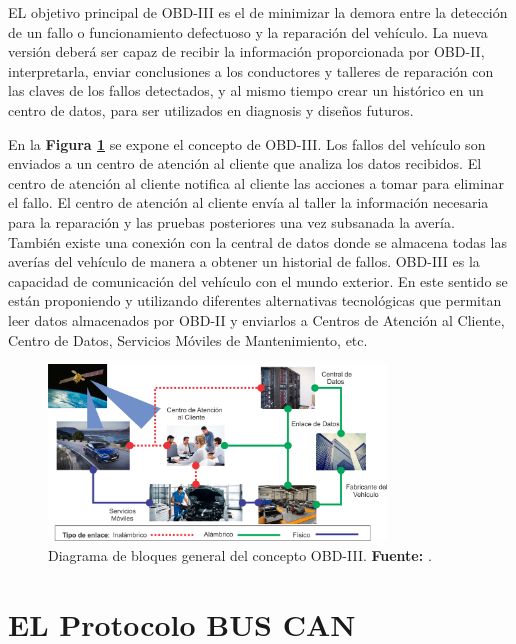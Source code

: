 EL objetivo principal de OBD-III es el de minimizar la demora entre la detección de un fallo o funcionamiento defectuoso y la reparación del vehículo. La nueva versión deberá ser capaz de recibir la información proporcionada por OBD-II, interpretarla, enviar conclusiones a los conductores y talleres de reparación con las claves de los fallos detectados, y al mismo tiempo crear  un histórico en un centro de datos, para ser utilizados en diagnosis y diseños futuros.


En la  \textbf{Figura \ref{DenB}} se expone el concepto de OBD-III. Los fallos del vehículo son enviados  a un centro de atención al cliente que analiza los datos recibidos. El centro de atención al cliente notifica al cliente las acciones a tomar para eliminar el fallo. El centro de atención al cliente envía al taller la información necesaria para la reparación  y las pruebas posteriores una vez subsanada la avería. También existe una conexión con la central de datos donde se almacena todas las averías del vehículo de manera a obtener un historial de fallos.
OBD-III es la capacidad de comunicación del vehículo con el mundo exterior. En este sentido se están proponiendo y utilizando diferentes alternativas tecnológicas que permitan leer datos almacenados por OBD-II y enviarlos a Centros de Atención al Cliente, Centro de Datos, Servicios Móviles de Mantenimiento, etc.

\begin{figure}[H]
	\centering
		\includegraphics[width=0.8\textwidth]{./Cap2imagen/J_concepto_OBDIII.png}
	\caption[Diagrama de bloques general del concepto OBD-III.]{Diagrama de bloques general del concepto OBD-III.\textbf{ Fuente:} \cite{DE}.}
	\label{DenB} %
\end{figure}


\section {EL Protocolo BUS CAN}

